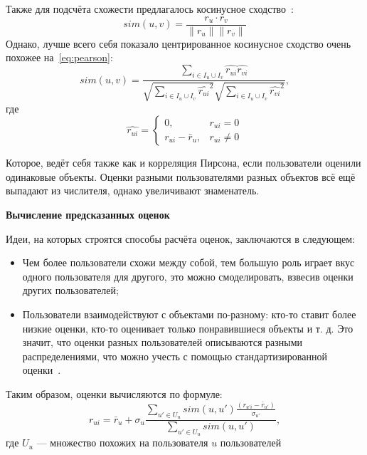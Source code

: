 Также для подсчёта схожести предлагалось косинусное сходство~\cite{breese}:
\begin{equation}\label{eq:cosine}
    sim(u, v) = \frac{r_u \cdot r_v}{\|r_u\| \| r_v\|{}}
\end{equation}
Однако, лучше всего себя показало центрированное косинусное сходство очень похожее на~\eqref{eq:pearson}:
\begin{equation}\label{eq:adjusted_cosine}
    sim(u, v) = \frac
    {\sum_{i \in I_u \cup I_v}{\hat{r_{ui}}\hat{r_{vi}}}}
    {\sqrt{\sum_{i \in I_u \cup I_v}{\hat{r_{ui}}^2}}
    \sqrt{\sum_{i \in I_u \cup I_v}{\hat{r_{vi}}^2}}},
\end{equation}
где
\begin{equation}
\hat{r_{ui}} =
\begin{cases}
    0, & r_{ui} = 0 \\
    r_{ui} - \bar r_{u}, & r_{ui} \neq 0
\end{cases}\label{eq:equation}
\end{equation}

Которое, ведёт себя также как и корреляция Пирсона, если пользователи оценили одинаковые объекты.
Оценки разными пользователями разных объектов всё ещё выпадают из числителя, однако увеличивают знаменатель.

\vspace{1em}
\textbf{Вычисление предсказанных оценок}

Идеи, на которых строятся способы расчёта оценок, заключаются в следующем:
\begin{itemize}
\item Чем более пользователи схожи между собой, тем большую роль играет вкус одного пользователя для другого, это можно смоделировать, взвесив оценки других пользователей;
\item Пользователи взаимодействуют с объектами по-разному: кто-то ставит более низкие оценки, кто-то оценивает только понравившиеся объекты и т. д.
Это значит, что оценки разных пользователей описываются разными распределениями, что можно учесть с помощью стандартизированной оценки~\cite{z-score}.
\end{itemize}

Таким образом, оценки вычисляются по формуле:
\begin{equation}\label{eq:z-score}
    r_{ui} = \bar r_u + \sigma_u \frac
    {\sum_{u' \in U_u}{sim(u, u')\frac{(r_{u'i} - \bar r_{u'})}{\sigma_{u'}}}}
    {\sum_{u' \in U_u}{sim(u, u')}},
\end{equation}
где $U_u$ --- множество похожих на пользователя $u$ пользователей

